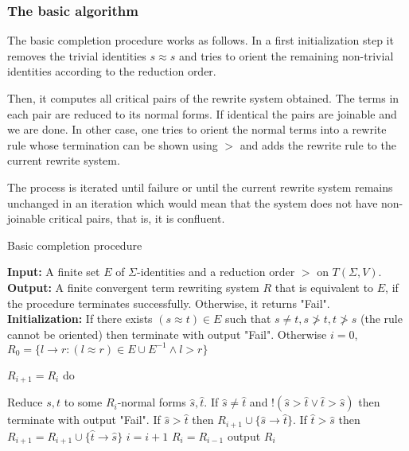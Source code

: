 \subsubsection{The basic algorithm}

The basic completion procedure works as follows. In a first initialization step it removes the trivial identities $s \approx s$ and tries to orient the remaining non-trivial identities according to the reduction order. 

Then, it computes all critical pairs of the rewrite system obtained. The terms in each pair are reduced to its normal forms. If identical the pairs are joinable and we are done. In other case, one tries to orient the normal terms into a rewrite rule whose termination can be shown using $>$ and adds the rewrite rule to the current rewrite system. 

The process is iterated until failure or until the current rewrite system remains unchanged in an iteration which would mean that the system does not have non-joinable critical pairs, that is, it is confluent.  

\begin{algorithm}[H]
\caption{Basic completion procedure}
\hspace*{\algorithmicindent} \textbf{Input:} A finite set $E$ of $\Sigma$-identities and a reduction order $>$ on $T(\Sigma,V)$. \\
\hspace*{\algorithmicindent} \textbf{Output:} A finite convergent term rewriting system $R$ that is equivalent to $E$, if the procedure terminates successfully. Otherwise, it returns "Fail". \\
\hspace*{\algorithmicindent} \textbf{Initialization:} If there exists $(s \approx t) \in E$ such that $s \neq t,s \not> t, t \not> s$ (the rule cannot be oriented) then terminate with output "Fail". Otherwise $i = 0$, $R_0 = \{l \to r:(l \approx r) \in E \cup E^{-1} \land l > r \}$

\begin{algorithmic}
\Repeat

\State $R_{i+1} = R_i$
 do

\State Reduce $s,t$ to some $R_i$-normal forms $\hat s,\hat t$.
\State If $\hat s \neq \hat t$ and $! (\hat s > \hat t \lor \hat t > \hat s)$ then terminate with output "Fail".
\State If $\hat s > \hat t$ then $R_{i+1} \cup \{\hat s \to \hat t \}$.
\State If $\hat t > \hat s$ then $R_{i+1} = R_{i+1} \cup \{\hat t \to \hat s \}$
\EndFor
\State $i = i+1$
\Until $R_i = R_{i-1}$
\State output $R_i$
\end{algorithmic}
\end{algorithm}

